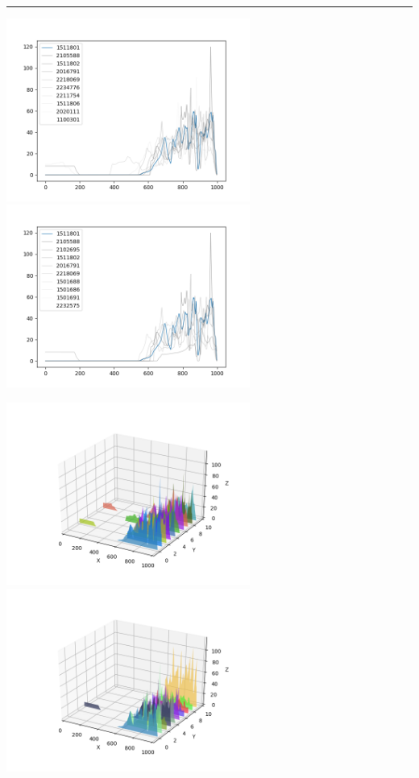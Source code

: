 \documentclass{article}
\begin{document}
\begin{center}
\noindent\rule{\textwidth}{1pt}

\includegraphics[height=6cm, width=8cm]{8.png}\includegraphics[height=6cm, width=8cm]{8_cos.png}

\includegraphics[height=6cm, width=8cm]{8_3d.png} \includegraphics[height=6cm, width=8cm]{8_cos_3d.png}


\end{center}
\end{document}
